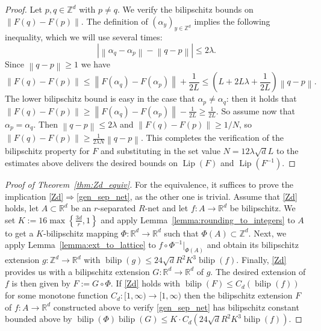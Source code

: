 \documentclass[a4paper, bibliography=totoc]{scrartcl}
\numberwithin{claimcounter}{define}
\newcommand{\R}{\mathbb{R}}
\newcommand{\Z}{\mathbb{Z}}
\newcommand{\rest}[2]{#1|_{#2}} %
\newcommand{\lip}{\operatorname{Lip}}
\newcommand{\bilip}{\operatorname{bilip}}
\newcommand{\abs}[1]{\left|#1\right|}
\newcommand{\enorm}[1]{\left\|#1\right\|}
\newcommand{\set}[1]{\left\{#1\right\}}
\newcommand{\br}[1]{\left(#1\right)}
\begin{document}
\begin{proof}
	Let $p,q\in \Z^{d}$ with $p\neq q$. We verify the bilipschitz bounds on $\enorm{F(q)-F(p)}$. The definition of $(\alpha_{y})_{y\in\Z^{d}}$ implies the following inequality, which we will use several times:
	\begin{equation*}
	\abs{\enorm{\alpha_{q}-\alpha_{p}}-\enorm{q-p}}\leq 2\lambda.
	\end{equation*}
	Since $\enorm{q-p}\geq 1$ we have
	\begin{equation*}
	\enorm{F(q)-F(p)}\leq \enorm{F(\alpha_{q})-F(\alpha_{p})}+\frac{1}{2L}\leq \br{L+2L\lambda+\frac{1}{2L}}\enorm{q-p}.
	\end{equation*}
	The lower bilipschitz bound is easy in the case that $\alpha_{p}\neq \alpha_{q}$: then it holds that $\enorm{F(q)-F(p)}\geq \enorm{F(\alpha_{q})-F(\alpha_{p})}-\frac{1}{2L}\geq \frac{1}{2L}$. So assume now that $\alpha_{p}=\alpha_{q}$. Then $\enorm{q-p}\leq 2\lambda$ and $\enorm{F(q)-F(p)}\geq 1/N$, so $\enorm{F(q)-F(p)}\geq \frac{1}{2\lambda N}\enorm{q-p}$. This completes the verification of the bilipschitz property for $F$ and substituting in the set value $N=12\lambda \sqrt{d}L$ to the estimates above delivers the desired bounds on $\lip(F)$ and $\lip(F^{-1})$.
\end{proof}

\begin{proof}[Proof of Theorem~\ref{thm:Zd_equiv}]
	For the equivalence, it suffices to prove the implication \eqref{Zd}$\Rightarrow$\eqref{gen_sep_net}, as the other one is trivial. Assume that \eqref{Zd} holds, let $A\subset\R^d$ be an $r$-separated $R$-net and let $f\colon A\to \R^{d}$ be bilipschitz.
	We set $K:=16\max\set{\frac{3d}{r},1}$ and apply Lemma~\ref{lemma:rounding_to_integers} to $A$ to get a $K$-bilipschitz mapping $\Phi\colon\R^d\to\R^d$ such that $\Phi(A)\subset\Z^d$.
	Next, we apply Lemma~\ref{lemma:ext_to_lattice} to $\rest{f\circ \Phi^{-1}}{\Phi(A)}$ and obtain its bilipschitz extension $g\colon \Z^d\to\R^d$ with $\bilip(g)\leq 24\sqrt{d} R^2K^3\bilip(f)$.
	Finally, \eqref{Zd} provides us with a bilipschitz extension $G\colon \R^{d}\to \R^{d}$ of $g$. The desired extension of $f$ is then given by $F:=G\circ \Phi$.
	If \eqref{Zd} holds with $\bilip(F)\leq C_d(\bilip(f))$ for some monotone function $C_d\colon [1,\infty)\to [1,\infty)$ then the bilipschitz extension $F$ of $f\colon A\to \R^{d}$ constructed above to verify \eqref{gen_sep_net} has bilipschitz constant bounded above by $\bilip(\Phi)\bilip(G)\leq K\cdot C_d\br{24\sqrt{d}R^{2}K^{3}\bilip(f)}$.
\end{proof}
\end{document}
